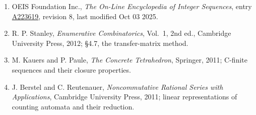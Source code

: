 \documentclass[11pt]{article}
\theoremstyle{definition}
\begin{document}
\begin{enumerate}

\item OEIS Foundation Inc., \emph{The On-Line Encyclopedia of Integer Sequences}, entry \href{https://oeis.org/A223619}{A223619}, revision 8, last modified Oct 03 2025.

\item R. P. Stanley, \emph{Enumerative Combinatorics}, Vol.~1, 2nd ed., Cambridge University Press, 2012; \S4.7, the transfer-matrix method.

\item M. Kauers and P. Paule, \emph{The Concrete Tetrahedron}, Springer, 2011; C-finite sequences and their closure properties.

\item J. Berstel and C. Reutenauer, \emph{Noncommutative Rational Series with Applications}, Cambridge University Press, 2011; linear representations of counting automata and their reduction.

\end{enumerate}
\end{document}
